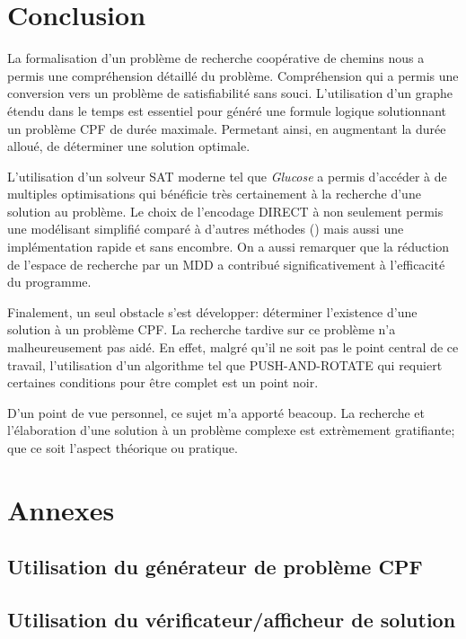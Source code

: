 \documentclass[french, 10pt, letterpaper]{article}
\theoremstyle{definition}
\theoremstyle{proposition}
\theoremstyle{example}
\begin{document}
    \newpage
    \section{Conclusion}

    La formalisation d'un problème de recherche coopérative de chemins nous a permis une compréhension détaillé du problème.
    Compréhension qui a permis une conversion vers un problème de satisfiabilité sans souci. L'utilisation d'un graphe étendu dans
    le temps est essentiel pour généré une formule logique solutionnant un problème CPF de durée maximale. 
    Permetant ainsi, en augmentant la durée alloué, de déterminer une solution optimale.

    L'utilisation d'un solveur SAT moderne tel que \emph{Glucose} a permis d'accéder à de multiples optimisations qui bénéficie très certainement
    à la recherche d'une solution au problème. Le choix de l'encodage DIRECT à non seulement permis une modélisant simplifié comparé à d'autres
    méthodes (\cite{PSUR16}) mais aussi une implémentation rapide et sans encombre. On a aussi remarquer que la réduction de l'espace
    de recherche par un MDD a contribué significativement à l'efficacité du programme.

    Finalement, un seul obstacle s'est développer: déterminer l'existence d'une solution à un problème CPF. La recherche tardive sur ce problème
    n'a malheureusement pas aidé. En effet, malgré qu'il ne soit pas le point central de ce travail, l'utilisation d'un algorithme tel que
    PUSH-AND-ROTATE \cite{WILDEPAR} qui requiert certaines conditions pour être complet est un point noir. 

    D'un point de vue personnel, ce sujet m'a apporté beacoup. La recherche et l'élaboration d'une solution à un problème complexe est 
    extrèmement gratifiante; que ce soit l'aspect théorique ou pratique.

    
    \newpage
    

    \section{Annexes}
    \subsection{Utilisation du générateur de problème CPF}
    \subsection{Utilisation du vérificateur/afficheur de solution}
\end{document}
